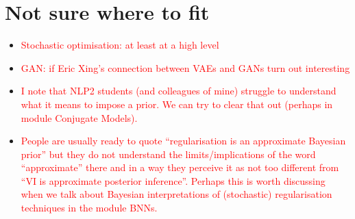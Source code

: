 \documentclass[11pt, a4paper]{article}
\newcommand{\wnote}[1]{\textcolor{red}{#1}}
\begin{document}
\section{Not sure where to fit}

\begin{itemize}
	\item \wnote{Stochastic optimisation: at least at a high level}
	\item \wnote{GAN: if Eric Xing's connection between VAEs and GANs turn out interesting}	
	\item \wnote{I note that NLP2 students (and colleagues of mine) struggle to understand what it means to impose a prior. We can try to clear that out (perhaps in module Conjugate Models).}
	\item \wnote{People are usually ready to quote ``regularisation is an approximate Bayesian prior'' but they do not understand the limits/implications of the word ``approximate'' there and in a way they perceive it as not too different from ``VI is approximate posterior inference''. Perhaps this is worth discussing when we talk about Bayesian interpretations of (stochastic) regularisation techniques in the module BNNs.}
\end{itemize}
\end{document}
